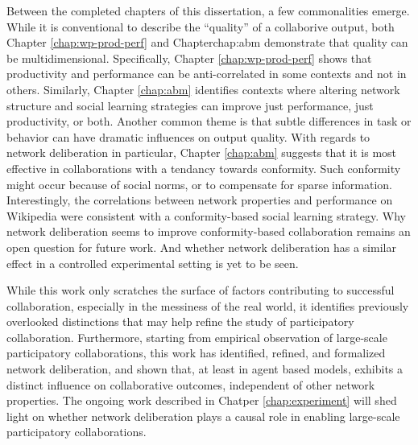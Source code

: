 Between the completed chapters of this dissertation, a few commonalities emerge.
While it is conventional to describe the ``quality'' of a collaborive output,
both Chapter \ref{chap:wp-prod-perf} and Chapter{chap:abm} demonstrate that
quality can be multidimensional.
Specifically, Chapter \ref{chap:wp-prod-perf} shows that productivity and performance can
be anti-correlated in some contexts and not in others.
Similarly, Chapter \ref{chap:abm} identifies contexts where altering network structure
and social learning strategies can improve just performance, just productivity, or both.
Another common theme is that subtle differences in task or behavior can have dramatic
influences on output quality.
With regards to network deliberation in particular, Chapter \ref{chap:abm} suggests
that it is most effective in collaborations with a tendancy towards conformity.
Such conformity might occur because of social norms, or to compensate for sparse information.
Interestingly, the correlations between network properties and performance on Wikipedia
were consistent with a conformity-based social learning strategy.
Why network deliberation seems to improve conformity-based collaboration remains an
open question for future work.
And whether network deliberation has a similar effect in a controlled experimental
setting is yet to be seen.

While this work only scratches the surface of factors contributing to successful collaboration,
especially in the messiness of the real world, it identifies previously overlooked distinctions
that may help refine the study of participatory collaboration. Furthermore, starting from empirical
observation of large-scale participatory collaborations, this work has identified, refined, and formalized
network deliberation, and shown that, at least in agent based models, exhibits a distinct influence
on collaborative outcomes, independent of other network properties.
The ongoing work described in Chatper \ref{chap:experiment} will shed light on whether network deliberation
plays a causal role in enabling large-scale participatory collaborations.

